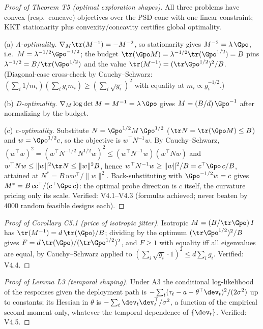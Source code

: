 \documentclass[11pt]{article}
\begin{document}
\begin{proof}[Proof of Theorem T5 (optimal exploration shapes)]
All three problems have convex (resp.\ concave) objectives over the PSD
cone with one linear constraint; KKT stationarity plus
convexity/concavity certifies global optimality.

(a) \emph{A-optimality.} $\nabla_M \tr(M^{-1}) = -M^{-2}$, so stationarity
gives $M^{-2} = \lambda\,\Gpo$, i.e.\ $M = \lambda^{-1/2}\Gpo^{-1/2}$;
the budget $\tr(\Gpo M) = \lambda^{-1/2}\tr(\Gpo^{1/2}) = B$ pins
$\lambda^{-1/2} = B/\tr(\Gpo^{1/2})$ and the value
$\tr(M^{-1}) = (\tr \Gpo^{1/2})^2/B$. (Diagonal-case cross-check by
Cauchy--Schwarz: $(\sum_i 1/m_i)(\sum_i g_i m_i) \ge (\sum_i \sqrt{g_i})^2$
with equality at $m_i \propto g_i^{-1/2}$.)

(b) \emph{D-optimality.} $\nabla_M \log\det M = M^{-1} = \lambda\,\Gpo$
gives $M = (B/d)\,\Gpo^{-1}$ after normalizing by the budget.

(c) \emph{c-optimality.} Substitute $N = \Gpo^{1/2} M\,\Gpo^{1/2}$
($\tr N = \tr(\Gpo M) \le B$) and $w = \Gpo^{1/2} c$, so the objective is
$w^\top N^{-1} w$. By Cauchy--Schwarz,
$(w^\top w)^2 = (w^\top N^{-1/2}\,N^{1/2} w)^2
\le (w^\top N^{-1} w)(w^\top N w)$ and $w^\top N w \le \|w\|^2 \tr N \le
\|w\|^2 B$, hence $w^\top N^{-1} w \ge \|w\|^2/B = c^\top \Gpo\,c/B$,
attained at $N^* = B\,ww^\top/\|w\|^2$. Back-substituting with
$\Gpo^{-1/2}w = c$ gives $M^* = B\,cc^\top/(c^\top\Gpo\,c)$: the optimal
probe direction is $c$ itself, the curvature pricing only its scale.
Verified: V4.1--V4.3 (formulas achieved; never beaten by $4000$ random
feasible designs each).
\end{proof}

\begin{proof}[Proof of Corollary C5.1 (price of isotropic jitter)]
Isotropic $M = (B/\tr\Gpo)\,I$ has $\tr(M^{-1}) = d\,\tr(\Gpo)/B$; dividing
by the optimum $(\tr\Gpo^{1/2})^2/B$ gives
$F = d\,\tr(\Gpo)/(\tr\Gpo^{1/2})^2$, and $F \ge 1$ with equality iff all
eigenvalues are equal, by Cauchy--Schwarz applied to
$(\sum_i \sqrt{g_i}\cdot 1)^2 \le d \sum_i g_i$. Verified: V4.4.
\end{proof}

\begin{proof}[Proof of Lemma L3 (temporal shaping)]
Under A3 the conditional log-likelihood of the responses given the
deployment path is $-\sum_t (\tau_t - a - \theta^\top \dev_t)^2/(2\sigma^2)$
up to constants; its Hessian in $\theta$ is $-\sum_t \dev_t
\dev_t^\top/\sigma^2$, a function of the empirical second moment only,
whatever the temporal dependence of $\{\dev_t\}$. Verified: V4.5.
\end{proof}
\end{document}
